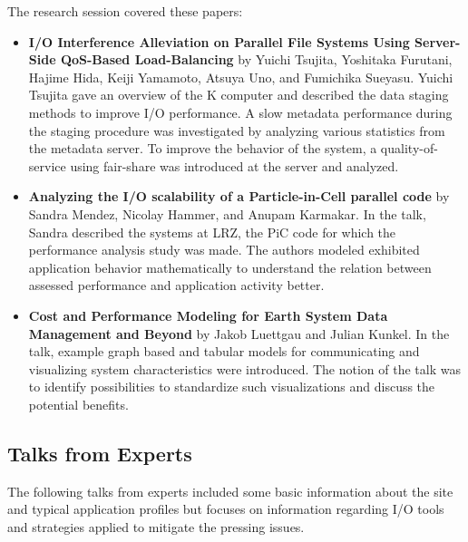 \documentclass{llncs}
\begin{document}
The research session covered these papers:
\begin{itemize}
\item \textbf{I/O Interference Alleviation on Parallel File Systems Using Server-Side QoS-Based Load-Balancing} by Yuichi Tsujita, Yoshitaka Furutani, Hajime Hida, Keiji Yamamoto, Atsuya Uno, and Fumichika Sueyasu.
Yuichi Tsujita gave an overview of the K computer and described the data staging methods to improve I/O performance.
A slow metadata performance during the staging procedure was investigated by analyzing various statistics from the metadata server.
To improve the behavior of the system, a quality-of-service using fair-share was introduced at the server and analyzed.


\item \textbf{Analyzing the I/O scalability of a Particle-in-Cell parallel code} by
Sandra Mendez, Nicolay Hammer, and Anupam Karmakar.
In the talk, Sandra described the systems at LRZ, the PiC code for which the performance analysis study was made.
The authors modeled exhibited application behavior mathematically to understand the relation between assessed performance and application activity better.

\item \textbf{Cost and Performance Modeling for Earth System Data Management and Beyond} by Jakob Luettgau and Julian Kunkel.
In the talk, example graph based and tabular models for communicating and visualizing system characteristics were introduced.
The notion of the talk was to identify possibilities to standardize such visualizations and discuss the potential benefits.
\end{itemize}

\subsection{Talks from Experts}

The following talks from experts included some basic information about the site and typical application profiles but focuses on information regarding I/O tools and strategies applied to mitigate the pressing issues.
\end{document}
